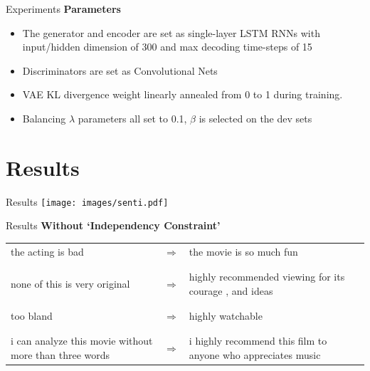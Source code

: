 \documentclass{beamer}
\begin{document}
\begin{frame}{Experiments}
  \textbf{Parameters}
  \begin{itemize}
    \item The generator and encoder are set as single-layer LSTM RNNs with input/hidden dimension of 300 and max decoding time-steps of 15
    \item Discriminators are set as Convolutional Nets
    \item VAE KL divergence weight linearly annealed from 0 to 1 during training.
    \item Balancing $\lambda$ parameters all set to 0.1, $\beta$ is selected on the dev sets
  \end{itemize}
\end{frame}

\section{Results}
\begin{frame}{Results}
  \centering
  \texttt{[image: images/senti.pdf]}
\end{frame}

\begin{frame}{Results}
  \centering
  \textbf{Without `Independency Constraint'} \\
  \vspace{1cm}
  \small
  \begin{tabular}{ p{.4\linewidth} p{.05\linewidth} p{.4\linewidth} }
    the acting is bad & $\Rightarrow$ & the movie is so much fun \\ \\ 
    \hline \\
    none of this is very original & $\Rightarrow$ & highly recommended viewing for its courage , and ideas \\ \\
    \hline \\
    too bland & $\Rightarrow$ & highly watchable \\ \\
    \hline \\
    i can analyze this movie without more than three words & $\Rightarrow$ & i highly recommend this film to anyone who appreciates music
  \end{tabular}
\end{frame}
\end{document}
